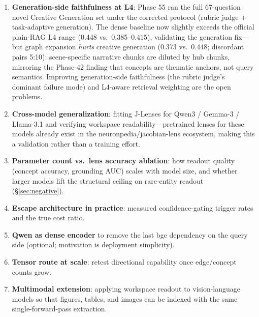 \begin{enumerate}
\item \textbf{Generation-side faithfulness at L4}: Phase 55 ran the full
67-question novel Creative Generation set under the corrected protocol
(rubric judge + task-adaptive generation). The dense baseline now slightly
exceeds the official plain-RAG L4 range (0.448 vs.\ 0.385--0.415), validating
the generation fix---but graph expansion \emph{hurts} creative generation
(0.373 vs.\ 0.448; discordant pairs 5:10): scene-specific narrative chunks
are diluted by hub chunks, mirroring the Phase-42 finding that concepts are
thematic anchors, not query semantics. Improving generation-side faithfulness
(the rubric judge's dominant failure mode) and L4-aware retrieval weighting
are the open problems.
\item \textbf{Cross-model generalization}: fitting J-Lenses for
Qwen3 / Gemma-3 / Llama-3.1 and verifying workspace readability---pretrained
lenses for these models already exist in the
neuronpedia/jacobian-lens ecosystem, making this a validation rather than a
training effort.
\item \textbf{Parameter count vs.\ lens accuracy ablation}: how readout
quality (concept accuracy, grounding AUC) scales with model size, and whether
larger models lift the structural ceiling on rare-entity readout
(\S\ref{sec:negative}).
\item \textbf{Escape architecture in practice}: measured confidence-gating
trigger rates and the true cost ratio.
\item \textbf{Qwen as dense encoder} to remove the last bge dependency on the
query side (optional; motivation is deployment simplicity).
\item \textbf{Tensor route at scale}: retest directional capability once
edge/concept counts grow.
\item \textbf{Multimodal extension}: applying workspace readout to
vision-language models so that figures, tables, and images can be indexed with
the same single-forward-pass extraction.
\end{enumerate}
